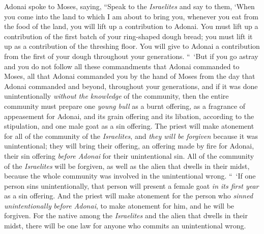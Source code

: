 \begin{biblechapter}
\verse Adonai spoke to Moses, saying,
\verse “Speak to the \textit{Israelites} and say to them, ‘When you come into the land to which I am about to bring you,
\verse whenever you eat from the food of the land, you will lift up a contribution to Adonai.
\verse You must lift up a contribution of the first batch of your ring-shaped dough bread; you must lift it up as a contribution of the threshing floor.
\verse You will give to Adonai a contribution from the first of your dough throughout your generations.
\verse “ ‘But if you go astray and you do not follow all these commandments that Adonai commanded to Moses,
\verse all that Adonai commanded you by the hand of Moses from the day that Adonai commanded and beyond, throughout your generations,
\verse and if it was done unintentionally \textit{without the knowledge} of the community, then the entire community must prepare one \textit{young bull} as a burnt offering, as a fragrance of appeasement for Adonai, and its grain offering and its libation, according to the stipulation, and one male goat as a sin offering.
\verse The priest will make atonement for all of the community of the \textit{Israelites}, and \textit{they will be forgiven} because it was unintentional; they will bring their offering, an offering made by fire for Adonai, their sin offering \textit{before Adonai} for their unintentional sin.
\verse All of the community of the \textit{Israelites} will be forgiven, as well as the alien that dwells in their midst, because the whole community was involved in the unintentional wrong.
\verse “ ‘If one person sins unintentionally, that person will present a female goat \textit{in its first year} as a sin offering.
\verse And the priest will make atonement for the person who \textit{sinned unintentionally} \textit{before Adonai}, to make atonement for him, and he will be forgiven.
\verse For the native among the \textit{Israelites} and the alien that dwells in their midst, there will be one law for anyone who commits an unintentional wrong.

\end{biblechapter}
